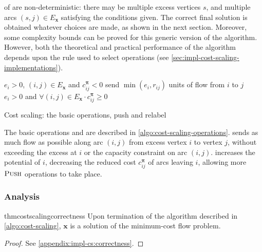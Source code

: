  of  are non-deterministic: there may be multiple excess vertices $s$, and multiple arcs $(s,j) \in E_\mathbf{x}$ satisfying the conditions given. The correct final solution is obtained whatever choices are made, as shown in the next section. Moreover, some complexity bounds can be proved for this generic version of the algorithm. However, both the theoretical and practical performance of the algorithm depends upon the rule used to select operations (see \cref{sec:impl-cost-scaling-implementations}).

\begin{algorithm}
\begin{algorithmic}[1]
    \Require $e_i > 0$, $(i,j) \in E_{\mathbf{x}}$ and $c^{\boldsymbol{\pi}}_{ij} < 0$
        \State send $\min\left(e_i, r_{ij}\right)$ units of flow from $i$ to $j$
    \EndFunction
    \setcounter{ALG@line}{0}
    \Statex
    \Require $e_i > 0$ and $\forall(i,j) \in E_{\mathbf{x}} \cdot c^{\boldsymbol{\pi}}_{ij} \geq 0$
    \EndFunction
\end{algorithmic}
\caption{Cost scaling: the basic operations, push and relabel}
\label{algo:cost-scaling-operations}
\end{algorithm}

The basic operations  and  are described in \cref{algo:cost-scaling-operations}.  sends as much flow as possible along arc $(i,j)$ from excess vertex $i$ to vertex $j$, without exceeding the excess at $i$ or the capacity constraint on arc $(i,j)$.  increases the potential of $i$, decreasing the reduced cost $c_{ij}^{\boldsymbol{\pi}}$ of arcs leaving $i$, allowing more $\textproc{Push}$ operations to take place.

\subsubsection{Analysis}

\begin{restatable}{thm}{costscalingcorrectness} \label{thm:cost-scaling-correctness}
    Upon termination of the algorithm described in \cref{algo:cost-scaling}, $\mathbf{x}$ is a solution of the minimum-cost flow problem.  
\end{restatable}
\begin{proof}
See \cref{appendix:impl-cs:correctness}.
\end{proof}

